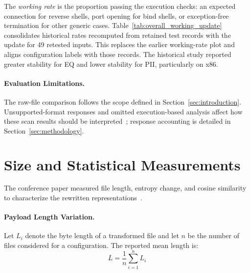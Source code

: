 \documentclass[runningheads]{llncs}
\begin{document}
\label{par:working_rate}
The \emph{working rate} is the proportion passing the execution checks:
an expected connection for reverse shells, port opening for bind shells,
or exception-free termination for other generic cases.
Table~\ref{tab:overall_working_update} consolidates historical rates
recomputed from retained test records with the update for 49 retested
inputs. This replaces the earlier working-rate plot and aligns
configuration labels with those records. The historical study reported
greater stability for EQ and lower stability for PII, particularly on x86.



\paragraph{Evaluation Limitations.}
The raw-file comparison follows the scope defined in
Section~\ref{sec:introduction}. Unsupported-format responses and omitted
execution-based analysis affect how these scan results should be
interpreted~\cite{zone_secrypt_2026}; response accounting is detailed in
Section~\ref{sec:methodology}.

\section{Size and Statistical Measurements}\label{sect:var_metrics}
The conference paper measured file length, entropy change, and cosine
similarity to characterize the rewritten representations~\cite{zone_secrypt_2026}.

\paragraph{Payload Length Variation.}
Let $L_i$ denote the byte length of a transformed file and let $n$ be the number of files considered for a configuration. The reported mean length is:
\[
\overline{L} = \frac{1}{n} \sum_{i=1}^{n} L_i
\]
\end{document}

